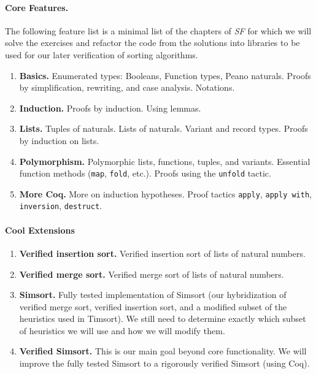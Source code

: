 \documentclass{article}
\begin{document}
\paragraph{Core Features.}
The following feature list is a minimal list of the chapters of \emph{SF}
for which we will solve the exercises and refactor the code from the solutions
into libraries to be used for our later verification of sorting algorithms.
\begin{enumerate}
  \item \textbf{Basics.}
    Enumerated types: Booleans, Function types, Peano naturals.
    Proofs by simplification, rewriting, and case analysis.
    Notations.
  \item \textbf{Induction.}
    Proofs by induction.
    Using lemmas.
  \item \textbf{Lists.}
    Tuples of naturals.
    Lists of naturals.
    Variant and record types.
    Proofs by induction on lists.
  \item \textbf{Polymorphism.}
    Polymorphic lists, functions, tuples, and variants.
    Essential function methods (\verb`map`, \verb`fold`, etc.).
    Proofs using the \verb`unfold` tactic.
  \item \textbf{More Coq.}
    More on induction hypotheses.
    Proof tactics \verb`apply`, \verb`apply with`,
    \verb`inversion`, \verb`destruct`.
\end{enumerate}

\paragraph{Cool Extensions}
\begin{enumerate}
  \item \textbf{Verified insertion sort.}
    Verified insertion sort of lists of natural numbers.
  \item \textbf{Verified merge sort.}
    Verified merge sort of lists of natural numbers.
  \item \textbf{Simsort.}
    Fully tested implementation of Simsort (our hybridization of verified
    merge sort, verified insertion sort, and a modified subset of the
    heuristics used in Timsort).
    We still need to determine exactly which subset of heuristics we will
    use and how we will modify them.
  \item \textbf{Verified Simsort.}
    This is our main goal beyond core functionality.
    We will improve the fully tested Simsort to
    a rigorously verified Simsort (using Coq).
\end{enumerate}
\end{document}

